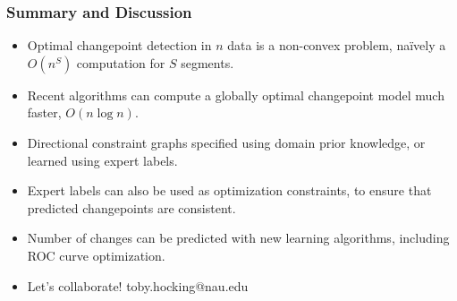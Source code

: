 \documentclass{beamer}
\begin{document}
\begin{frame}[fragile]
  \frametitle{Summary and Discussion}

  \begin{itemize}
  \item Optimal changepoint detection in $n$ data is a non-convex
    problem, na\" ively a $O(n^S)$ computation for $S$ segments.
  \item Recent algorithms can compute a globally optimal changepoint
    model much faster, $O(n\log n)$.
  \item Directional constraint graphs specified using domain prior
    knowledge, or learned using expert labels.
  \item Expert labels can also be used as optimization constraints, to
    ensure that predicted changepoints are consistent.
  \item Number of changes can be predicted with new learning
    algorithms, including ROC curve optimization.
  \item Let's collaborate! toby.hocking@nau.edu
  \end{itemize}
  
\end{frame}
\end{document}
